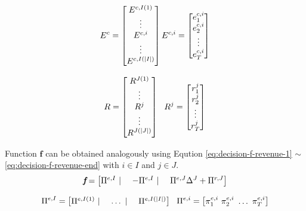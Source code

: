 \begin{equation}
E^c =
\begin{bmatrix}
E^{c,I(1)} \\ \vdots \\ E^{c,i} \\ \vdots\\ E^{c,I(|I|)}
\end{bmatrix} \\
E^{c,i} = 
\begin{bmatrix}
e_1^{c,i}\\e_2^{c,i}\\\vdots\\e_T^{c,i}
\end{bmatrix}
\end{equation}

\begin{equation}
\label{eq:decision-variable-end}
R =
\begin{bmatrix}
R^{J(1)} \\ \vdots \\R^{j} \\ \vdots \\ R^{J(|J|)}
\end{bmatrix} ~~~\\
R^{j} = 
\begin{bmatrix}
r_1^{j}\\r_2^{j}\\\vdots\\r_T^{j}
\end{bmatrix}
\end{equation}

Function $\textbf{f}$ can be obtained analogously using Eqution \eqref{eq:decision-f-revenue-1} $\sim$ \eqref{eq:decision-f-revenue-end} with $i \in I$ and $j \in J$.
\begin{equation}
\label{eq:decision-f-revenue-1}
\textit{\textbf{f}} =
\begin{bmatrix}
\Pi^{e,I}~|~&-\Pi^{e,I}~|~&\Pi^{e,J} \Delta^J + \Pi^{r,J}
\end{bmatrix}
\end{equation}

\begin{equation}
\Pi^{e, I} =
\begin{bmatrix}
\Pi^{e,I(1)}~|~&\dots~|~&\Pi^{e,I(|I|)}
\end{bmatrix} ~~~\\
\Pi^{e,i} = 
\begin{bmatrix}
\pi_1^{e,i}~\pi_2^{e,i}~\dots~\pi_T^{e,i}
\end{bmatrix}
\end{equation}

